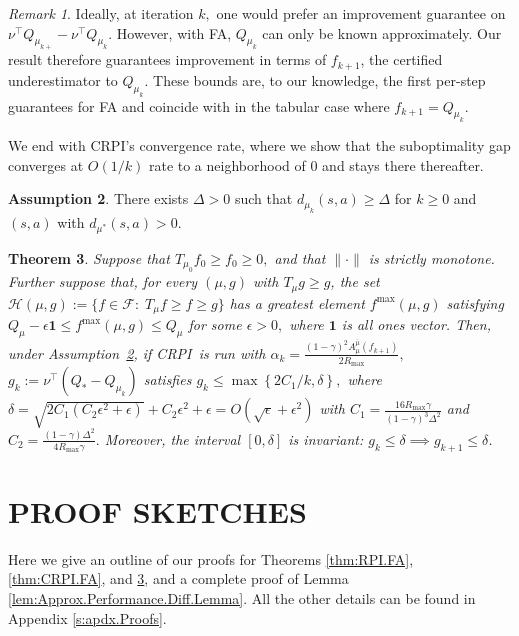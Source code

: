 \documentclass[twoside]{article}
\theoremstyle{plain}
\newtheorem{theorem}{Theorem}[section]
\theoremstyle{definition}
\newtheorem{assumption}[theorem]{Assumption}
\theoremstyle{remark}
\newtheorem{remark}[theorem]{Remark}
\newcommand{\tr}{\top}
\newcommand{\QS}{Q_*}
\newcommand{\mub}{\bar{\mu}}
\newcommand{\CRPI}{CRPI}
\newcommand{\cF}{\mathcal{F}}
\newcommand{\ones}{\mathbf{1}}
\begin{document}
\begin{remark} 
    Ideally, at iteration $k,$ one would prefer an improvement guarantee on $\nu^\tr Q_{\mu_{k + }} - \nu^\tr Q_{\mu_k}.$ However, with FA, $Q_{\mu_k}$ can only be known approximately. Our result therefore guarantees improvement in terms of $f_{k + 1}$, the certified underestimator to $Q_{\mu_k}.$ These bounds are, to our knowledge, the first per-step guarantees for FA and coincide with \cite[Corollary~5]{metelli2021safe} in the tabular case where $f_{k + 1} = Q_{\mu_k}.$
\end{remark}


We end with \CRPI's convergence rate, where we show that the suboptimality gap converges at $O(1/k)$ rate to a neighborhood of $0$ and stays there  thereafter.

\begin{assumption}\label{ass:positivity}
There exists $\Delta>0$ such that $
d_{\mu_k}(s,a)\ge \Delta$ for $k \geq 0$ and $(s, a)$ with $ d_{\mu^*}(s,a)>0.$ 
\end{assumption}

\begin{theorem}
\label{prop:conv_rate}
Suppose that $T_{\mu_0}f_0 \geq f_0 \geq 0,$ and that $\|\cdot\|$ is strictly monotone. Further suppose that,  for every $(\mu, g)$ with $T_\mu g \ge g$, the set $\mathcal H(\mu,g):=\{f\in\cF:\; T_\mu f\ge f\ge g\}$ has a greatest element $f^{\max}(\mu,g)$ satisfying $Q_\mu-\epsilon\ones \le f^{\max}(\mu,g)\le Q_\mu$ for some $\epsilon>0,$ where $\ones$ is all ones vector. Then, under Assumption~\ref{ass:positivity}, if \CRPI\ is run with $\alpha_k = \frac{(1 - \gamma)^2 A_{\mu}^{\mub}(f_{k + 1})}{2 R_{\max}},$ 
$g_k:=\nu^\top(\QS-Q_{\mu_k})$ satisfies $g_k \leq \max\left\{2C_1/k, \delta\right\},$ 
where $\delta = \sqrt{2C_1 (C_2 \epsilon^2 + \epsilon)} + C_2 \epsilon^2 + \epsilon = O(\sqrt{\epsilon} + \epsilon^2 )$ with 
$C_1 = \frac{16 R_{\max} \gamma}{(1 - \gamma)^3 \Delta^2}$ and $C_2 = \frac{(1 - \gamma) \Delta^2}{4 R_{\max} \gamma}.$ Moreover, the interval $[0, \delta]$ is invariant: $g_k \leq \delta \implies g_{k + 1} \leq \delta$. 
%
\end{theorem}

\section{PROOF SKETCHES}
\label{s:proofs}

Here we give an outline of our proofs for Theorems \ref{thm:RPI.FA}, \ref{thm:CRPI.FA}, and \ref{prop:conv_rate}, and a complete proof of Lemma \ref{lem:Approx.Performance.Diff.Lemma}. All the other details can be found in Appendix \ref{s:apdx.Proofs}.
\end{document}
